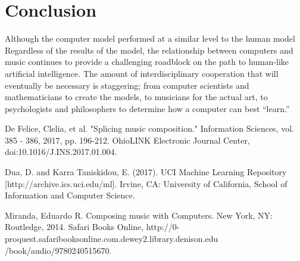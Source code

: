 \documentclass[12pt]{article}
\begin{document}
\section{Conclusion}
Although the computer model performed at a similar level to the human model
Regardless of the results of the model, the relationship between computers and music continues to provide a challenging roadblock on the path to human-like artificial intelligence. The amount of interdisciplinary cooperation that will eventually be necessary is staggering; from computer scientists and mathematicians to create the models, to musicians for the actual art, to psychologists and philosophers to determine how a computer can best ``learn.'' 

\begin{thebibliography}{10}
  De Felice, Clelia, et al. "Splicing music composition." Information Sciences, vol. 385 - 386, 2017, pp. 196-212. OhioLINK Electronic Journal Center, doi:10.1016/J.INS.2017.01.004.

  Dua, D. and Karra Taniskidou, E. (2017). UCI Machine Learning Repository [http://archive.ics.uci.edu/ml]. Irvine, CA: University of California, School of Information and Computer Science.

  Miranda, Eduardo R. Composing music with Computers. New York, NY: Routledge, 2014. Safari Books Online, http://0-proquest.safaribooksonline.com.dewey2.library.denison.edu\\/book/audio/9780240515670.
\end{thebibliography}
\end{document}
